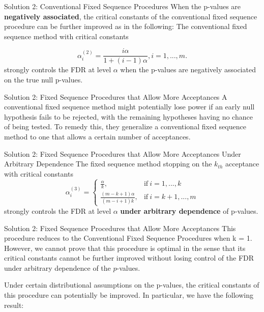 \documentclass{beamer}
\begin{document}
\begin{frame}[t]{Solution 2: Conventional Fixed Sequence Procedures}\vspace{10pt}
When the p-values are \textbf{negatively associated}, the critical constants of the conventional fixed sequence procedure can be further improved as in the following:
The conventional fixed sequence method with critical constants

$$ \alpha_i^{(2)} = \frac{i\alpha}{1+(i-1)\alpha}, i =1,...,m. $$strongly controls the FDR at level $\alpha$ when the p-values are negatively associated on the true null p-values.

\end{frame}


\begin{frame}[t]{Solution 2: Fixed Sequence Procedures that Allow More Acceptances}\vspace{10pt}
A conventional fixed sequence method might potentially lose power if an early null hypothesis fails to be rejected, with the remaining hypotheses having no chance of being tested. To remedy this, they generalize a conventional fixed sequence method to one that
allows a certain number of acceptances.
\end{frame}

\begin{frame}[t]{Solution 2: Fixed Sequence Procedures that Allow More Acceptances Under Arbitrary Dependence}\vspace{10pt}
The fixed sequence method stopping on the $k_{th}$ acceptance with critical constants
$$ \alpha_i^{(3)} = \begin{cases}
\frac{\alpha}{k}, & \text{if}\ i = 1,...,k \\
\frac{(m-k+1)\alpha}{(m-i+1)k}, &  \text{if}\ i = k+1,...,m
\end{cases} $$
strongly controls the FDR at level $\alpha$ \textbf{under arbitrary dependence} of p-values. 
\end{frame}

\begin{frame}[t]{Solution 2: Fixed Sequence Procedures that Allow More Acceptances}\vspace{10pt}
This procedure reduces to the  Conventional Fixed Sequence Procedures when k = 1. However, we cannot prove that this procedure is optimal in the sense that its critical constants cannot be further improved without losing control of the FDR under arbitrary dependence of the $p$-values.

Under certain distributional assumptions on the p-values, the critical constants of this procedure can potentially be improved. In particular, we have the following result:
\end{frame}
\end{document}

